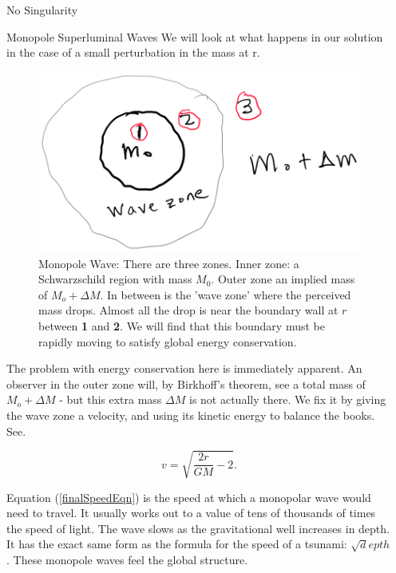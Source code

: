 \documentclass[final]{beamer}
\newlength{\sepwidth}
\newlength{\colwidth}
\newcommand{\separatorcolumn}{\begin{column}{\sepwidth}\end{column}}
\begin{document}
\begin{frame}[t]
\begin{columns}[t]
\begin{column}{\colwidth}
\begin{exampleblock}{No Singularity}
\end{exampleblock}

\begin{block}{Monopole Superluminal Waves}
	We will look at what happens in our solution in the case of a small perturbation in the mass at r. 
\begin{figure}
\includegraphics[width=0.45\columnwidth]{monopole.png}
\caption{Monopole Wave: There are three zones. Inner zone: a Schwarzschild region with mass $M_0$. Outer zone an implied mass of $M_o + \Delta M$. In between is the 'wave zone' where the perceived mass drops. Almost all the drop is near the boundary wall at $r$ between \textbf{1} and \textbf{2}. We will find that this boundary must be rapidly moving to satisfy global energy conservation.}
\label{monopoleEnergy} 
\end{figure}

The problem with energy conservation here is immediately apparent. An observer in the outer zone will, by Birkhoff's theorem, see a total mass of $M_o + \Delta M$ - but this extra mass $\Delta M$ is not actually there. We fix it by giving the wave zone a velocity, and using its kinetic energy to balance the books. See\cite{andersenEinsteinsMissingEnergy2025}.

\begin{equation} \label{finalSpeedEqn}
 v = \sqrt{\frac{2 r}{GM} - 2}.
\end{equation}

Equation (\ref{finalSpeedEqn}) is the speed at which a monopolar wave would need to travel. It usually works out to a value of tens of thousands of times the speed of light. The wave slows as the gravitational well increases in depth. It has the exact same form as the formula for the speed of a tsunami: $\sqrt depth$. These monopole waves feel the global structure.
\end{block}


\end{column}
\separatorcolumn



\end{columns}
\end{frame}
\end{document}
